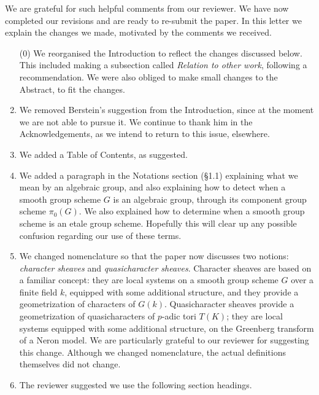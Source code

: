 \documentclass[a4, 10pt]{amsart}
\theoremstyle{definition}
\theoremstyle{remark}
\begin{document}
\rightline{\today}
\medskip

\medskip

We are grateful for such helpful comments from our reviewer. 
We have now completed our revisions and are ready to re-submit the paper. 
In this letter we explain the changes we made, motivated by the comments we received.

\begin{enumerate}
\item[(0)]
We reorganised the Introduction to reflect the changes discussed below. 
This included making a subsection called {\it Relation to other work}, following a recommendation.
We were also obliged to make small changes to the Abstract, to fit the changes.
\item
We removed Berstein's suggestion from the Introduction, since at the moment we are not able to pursue it. 
We continue to thank him in the Acknowledgements, as we intend to return to this issue, elsewhere.
\item
We added a Table of Contents, as suggested.
\item 
We added a paragraph in the Notations section (\S 1.1) explaining what we mean by an algebraic group, and also explaining how to detect when a smooth group scheme $G$ is an algebraic group, through its component group scheme $\pi_0(G)$.
We also explained how to determine when a smooth group scheme is an etale group scheme.
Hopefully this will clear up any possible confusion regarding our use of these terms.
\item
We changed nomenclature so that the paper now discusses two notions: {\it character sheaves} and {\it quasicharacter sheaves}. Character sheaves are based on a familiar concept: they are local systems on a smooth group scheme $G$ over a finite field $k$, equipped with some additional structure, and they provide a geometrization of characters of $G(k)$.  Quasicharacter sheaves provide a geometrization of quasicharacters of $p$-adic tori $T(K)$; they are local systems equipped with some additional structure, on the Greenberg transform of a Neron model. 
We are particularly grateful to our reviewer for suggesting this change.
Although we changed nomenclature, the actual definitions themselves did not change.
\item
The reviewer suggested we use the following section headings.
\begin{enumerate}

\end{enumerate}
\end{enumerate}
\end{document}
